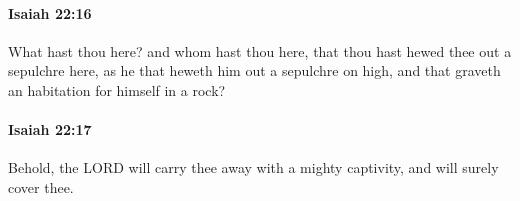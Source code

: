 		\paragraph{Isaiah 22:16} %
			\label{ISAIAH-22-16}

			What hast thou here? and whom hast thou here, that thou hast hewed thee out a sepulchre here, as he that heweth him out a sepulchre on high, and that graveth an habitation for himself in a rock?


		\paragraph{Isaiah 22:17} %
			\label{ISAIAH-22-17}

			Behold, the LORD will carry thee away with a mighty captivity, and will surely cover thee.


